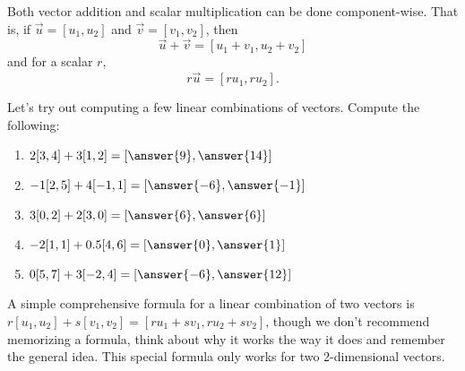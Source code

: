 \documentclass{ximera}
\begin{document}
\begin{remark}
    Both vector addition and scalar multiplication can be done component-wise. That is, if $\vec{u}=[u_1,u_2]$ and $\vec{v}=[v_1,v_2]$, then
    \[\vec{u}+\vec{v}=[u_1+v_1,u_2+v_2]\]
    and for a scalar $r$,
    \[r\vec{u}=[ru_1,ru_2].\]
\end{remark}

\begin{problem}
    Let's try out computing a few linear combinations of vectors. Compute the following:
    \begin{enumerate}
        \item $2[3,4]+3[1,2]=[\answer{9},\answer{14}]$
        \item $-1[2,5]+4[-1,1]=[\answer{-6},\answer{-1}]$
        \item $3[0,2]+2[3,0]=[\answer{6},\answer{6}]$
        \item $-2[1,1]+0.5[4,6]=[\answer{0},\answer{1}]$
        \item $0[5,7]+3[-2,4]=[\answer{-6},\answer{12}]$
    \end{enumerate}

    \begin{feedback}
        A simple comprehensive formula for a linear combination of two vectors is $r[u_1,u_2]+s[v_1,v_2]=[ru_1+sv_1,ru_2+sv_2]$, though we don't recommend memorizing a formula, think about why it works the way it does and remember the general idea. This special formula only works for two 2-dimensional vectors.
    \end{feedback}
\end{problem}
\end{document}
